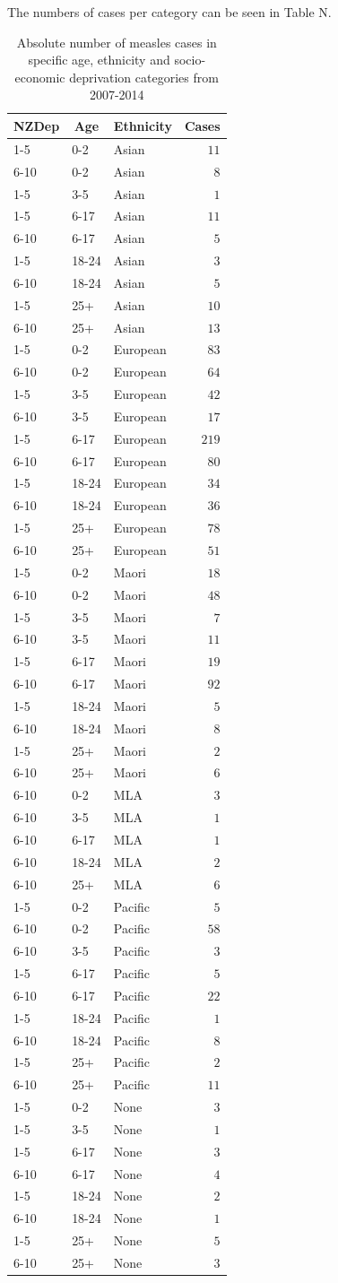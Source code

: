 \documentclass{article}
\begin{document}
The numbers of cases per category can be seen in Table N.
\begin{table}\tiny
\caption{Absolute number of measles cases in specific age, ethnicity and socio-economic deprivation categories from 2007-2014}
\begin{center}
\begin{tabular}{lllr}
\hline\hline
\multicolumn{1}{c}{NZDep}&\multicolumn{1}{c}{Age}&\multicolumn{1}{c}{Ethnicity}&\multicolumn{1}{c}{Cases}\tabularnewline
\hline
1-5&0-2&Asian&$ 11$\tabularnewline
6-10&0-2&Asian&$  8$\tabularnewline
1-5&3-5&Asian&$  1$\tabularnewline
1-5&6-17&Asian&$ 11$\tabularnewline
6-10&6-17&Asian&$  5$\tabularnewline
1-5&18-24&Asian&$  3$\tabularnewline
6-10&18-24&Asian&$  5$\tabularnewline
1-5&25+&Asian&$ 10$\tabularnewline
6-10&25+&Asian&$ 13$\tabularnewline
1-5&0-2&European&$ 83$\tabularnewline
6-10&0-2&European&$ 64$\tabularnewline
1-5&3-5&European&$ 42$\tabularnewline
6-10&3-5&European&$ 17$\tabularnewline
1-5&6-17&European&$219$\tabularnewline
6-10&6-17&European&$ 80$\tabularnewline
1-5&18-24&European&$ 34$\tabularnewline
6-10&18-24&European&$ 36$\tabularnewline
1-5&25+&European&$ 78$\tabularnewline
6-10&25+&European&$ 51$\tabularnewline
1-5&0-2&Maori&$ 18$\tabularnewline
6-10&0-2&Maori&$ 48$\tabularnewline
1-5&3-5&Maori&$  7$\tabularnewline
6-10&3-5&Maori&$ 11$\tabularnewline
1-5&6-17&Maori&$ 19$\tabularnewline
6-10&6-17&Maori&$ 92$\tabularnewline
1-5&18-24&Maori&$  5$\tabularnewline
6-10&18-24&Maori&$  8$\tabularnewline
1-5&25+&Maori&$  2$\tabularnewline
6-10&25+&Maori&$  6$\tabularnewline
6-10&0-2&MLA&$  3$\tabularnewline
6-10&3-5&MLA&$  1$\tabularnewline
6-10&6-17&MLA&$  1$\tabularnewline
6-10&18-24&MLA&$  2$\tabularnewline
6-10&25+&MLA&$  6$\tabularnewline
1-5&0-2&Pacific&$  5$\tabularnewline
6-10&0-2&Pacific&$ 58$\tabularnewline
6-10&3-5&Pacific&$  3$\tabularnewline
1-5&6-17&Pacific&$  5$\tabularnewline
6-10&6-17&Pacific&$ 22$\tabularnewline
1-5&18-24&Pacific&$  1$\tabularnewline
6-10&18-24&Pacific&$  8$\tabularnewline
1-5&25+&Pacific&$  2$\tabularnewline
6-10&25+&Pacific&$ 11$\tabularnewline
1-5&0-2&None&$  3$\tabularnewline
1-5&3-5&None&$  1$\tabularnewline
1-5&6-17&None&$  3$\tabularnewline
6-10&6-17&None&$  4$\tabularnewline
1-5&18-24&None&$  2$\tabularnewline
6-10&18-24&None&$  1$\tabularnewline
1-5&25+&None&$  5$\tabularnewline
6-10&25+&None&$  3$\tabularnewline
\hline
\end{tabular}\end{center}\label{table:cases}
\end{table}
\end{document}
